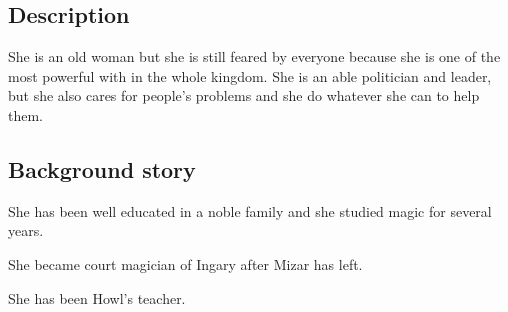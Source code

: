\subsection{Description}
She is an old woman but she is still feared by everyone because she is one of the most powerful with in the whole kingdom. She is an able politician and leader, but she also cares for people's problems and she do whatever she can to help them.

\subsection{Background story}
She has been well educated in a noble family and she studied magic for several years.

She became court magician of Ingary after Mizar has left.

She has been Howl’s teacher.
